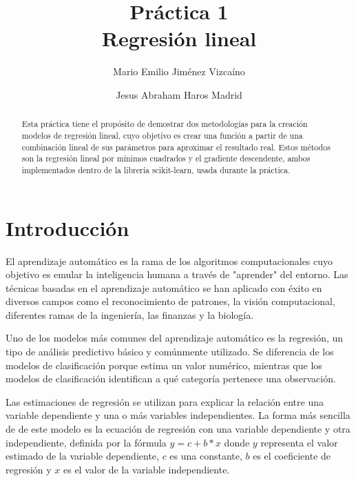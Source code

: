 \documentclass[sigconf,authorversion,nonacm]{acmart}
\begin{document}
\title{Práctica 1 \\ Regresión lineal}

\author{Mario Emilio Jiménez Vizcaíno}

\author{Jesus Abraham Haros Madrid}


\begin{abstract}
  Esta práctica tiene el propósito de demostrar dos metodologías para la creación modelos de regresión lineal, cuyo objetivo es crear una función a partir de una combinación lineal de sus parámetros para aproximar el resultado real. Estos métodos son la regresión lineal por mínimos cuadrados y el gradiente descendente, ambos implementados dentro de la librería scikit-learn, usada durante la práctica.
\end{abstract}

\maketitle

\section{Introducción}
El aprendizaje automático es la rama de los algoritmos computacionales cuyo objetivo es emular la inteligencia humana a través de "aprender" del entorno. Las técnicas basadas en el aprendizaje automático se han aplicado con éxito en diversos campos como el reconocimiento de patrones, la visión computacional, diferentes ramas de la ingeniería, las finanzas y la biología.\cite{el2015machine}

Uno de los modelos más comunes del aprendizaje automático es la regresión, un tipo de análisis predictivo básico y comúnmente utilizado. Se diferencia de los modelos de clasificación porque estima un valor numérico, mientras que los modelos de clasificación identifican a qué categoría pertenece una observación.

Las estimaciones de regresión se utilizan para explicar la relación entre una variable dependiente y una o más variables independientes. La forma más sencilla de de este modelo es la ecuación de regresión con una variable dependiente y otra independiente, definida por la fórmula $y = c + b * x$ donde $y$ representa el valor estimado de la variable dependiente, $c$ es una constante, $b$ es el coeficiente de regresión y $x$ es el valor de la variable independiente.
\end{document}
